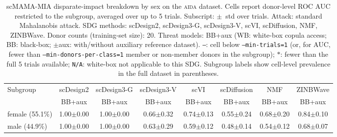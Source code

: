 \begin{table}[ht]
\centering
\small
\caption{scMAMA-MIA disparate-impact breakdown by sex on the \textsc{aida} dataset. Cells report donor-level ROC AUC restricted to the subgroup, averaged over up to 5 trials. Subscript: $\pm$~std over trials. Attack: standard Mahalanobis attack. SDG methods: scDesign2, scDesign3-G, scDesign3-V, scVI, scDiffusion, NMF, ZINBWave. Donor counts (training-set size): 20. Threat models: BB+aux (WB: white-box copula access; BB: black-box; $\pm$aux: with/without auxiliary reference dataset). \texttt{---}: cell below \texttt{--min-trials=1} (or, for AUC, fewer than \texttt{--min-donors-per-class=1} member or non-member donors in the subgroup); $*$: fewer than the full 5 trials available; \texttt{N/A}: white-box not applicable to this SDG. Subgroup labels show cell-level prevalence in the full dataset in parentheses.}
\label{tab:subgroup_aida_sex_sd2-sd3g-sd3v-scvi-scdiff-nmf-zinbwave_20d_100_auc}
\begin{tabular}{lccccccc}
\toprule
Subgroup & \multicolumn{1}{c|}{scDesign2} & \multicolumn{1}{c|}{scDesign3-G} & \multicolumn{1}{c|}{scDesign3-V} & \multicolumn{1}{c|}{scVI} & \multicolumn{1}{c|}{scDiffusion} & \multicolumn{1}{c|}{NMF} & \multicolumn{1}{c}{ZINBWave} \\
 & BB+aux & BB+aux & BB+aux & BB+aux & BB+aux & BB+aux & BB+aux \\
\midrule
female (55.1\%) & 1.00{\scriptsize$\pm$0.00} & 1.00{\scriptsize$\pm$0.00} & 0.66{\scriptsize$\pm$0.32} & 0.74{\scriptsize$\pm$0.13} & 0.55{\scriptsize$\pm$0.24} & 0.68{\scriptsize$\pm$0.20} & 0.84{\scriptsize$\pm$0.10} \\
male (44.9\%) & 1.00{\scriptsize$\pm$0.00} & 1.00{\scriptsize$\pm$0.00} & 0.63{\scriptsize$\pm$0.29} & 0.59{\scriptsize$\pm$0.12} & 0.48{\scriptsize$\pm$0.14} & 0.54{\scriptsize$\pm$0.12} & 0.68{\scriptsize$\pm$0.07} \\
\bottomrule
\end{tabular}
\end{table}

